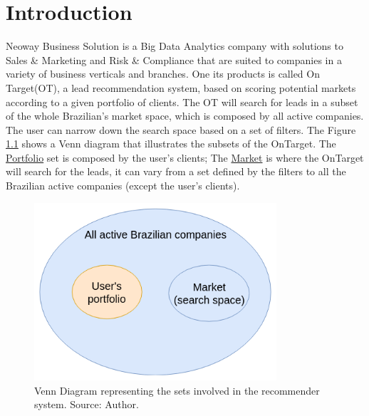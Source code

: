 \chapter{Introduction} 
\label{ch:introduction}

\fancyhead[ER]{\sffamily\footnotesize{\leftmark}}
\fancyhead[OL]{\sffamily\footnotesize{\rightmark}}

Neoway Business Solution is a Big Data Analytics company with solutions to Sales \& Marketing and Risk \& Compliance that are suited to companies in a variety of business verticals and branches. One its products is called On Target(OT), a lead recommendation system, based on scoring potential markets according to a given portfolio of clients. The OT will search for leads in a subset of the whole Brazilian's market space, which is composed by all active companies. The user can narrow down the search space based on a set of filters. The Figure \ref{fig:braz-comps-venn-diagram} shows a Venn diagram that illustrates the subsets of the OnTarget. The \underline{Portfolio} set is composed by the user's clients; The \underline{Market} is where the OnTarget will search for the leads, it can vary from a set defined by the filters to all the Brazilian active companies (except the user's clients).

\begin{figure}[h]
   \centering
   \includegraphics[width=9cm]{fig/ch1-brazil-comps-venn-diagram.png}
   \caption{Venn Diagram representing the sets involved in the recommender system. Source: Author.}
   \label{fig:braz-comps-venn-diagram}
\end{figure}

